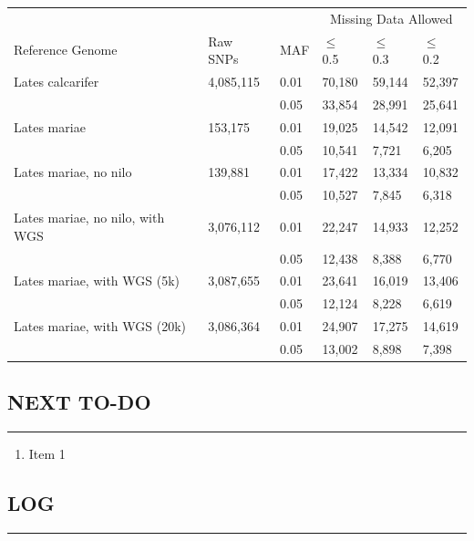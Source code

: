 \begin{table}[ht]
\label{table:gbs-stats}
\begin{tabular}{@{}llllll@{}}
\toprule
                 &           &     & \multicolumn{3}{c}{Missing Data Allowed}     \\
Reference Genome & Raw SNPs & MAF & $\leq$ 0.5 & $\leq$ 0.3    & $\leq$ 0.2    \\ \midrule
Lates calcarifer & 4,085,115 & 0.01 & 70,180 & 59,144 & 52,397 \\
                 &           & 0.05 & 33,854 & 28,991 & 25,641 \\ \midrule \midrule
Lates mariae    & 153,175   & 0.01 & 19,025 & 14,542 & 12,091 \\
                 &           & 0.05 & 10,541 & 7,721 & 6,205  \\ \midrule
Lates mariae, no nilo &  139,881  & 0.01 & 17,422 & 13,334 & 10,832 \\
                 &           & 0.05 & 10,527 & 7,845 & 6,318  \\ \midrule
Lates mariae, no nilo, with WGS & 3,076,112 & 0.01 & 22,247 & 14,933 & 12,252 \\
                 &           & 0.05 & 12,438 & 8,388 & 6,770 \\ \midrule
Lates mariae, with WGS (5k) & 3,087,655 & 0.01 & 23,641 & 16,019 & 13,406 \\
                 &           & 0.05 & 12,124 & 8,228 & 6,619 \\ \midrule
Lates mariae, with WGS (20k) & 3,086,364 & 0.01 & 24,907 & 17,275 & 14,619 \\
                 &           & 0.05 & 13,002 & 8,898 & 7,398 \\
\bottomrule
\end{tabular}
\end{table}

\subsection*{NEXT TO-DO}
\hrule

\begin{enumerate}
\item Item 1
\end{enumerate}
\subsection*{LOG}
\hrule

